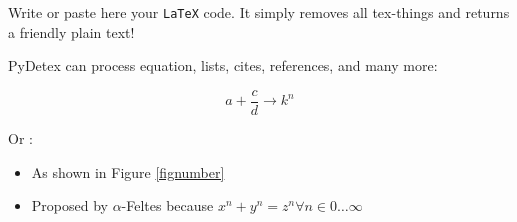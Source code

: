 Write or paste here your \texttt{LaTeX} code. It simply removes all tex-things and returns a friendly plain text! %

PyDetex can process equation, lists, cites, references, and many more:

\begin{equation}
    a + \frac{c}{d} \longrightarrow k^n
\end{equation}

Or :

\begin{itemize}[font=\bfseries]
    \item As shown in Figure \ref{fignumber}
    \item Proposed by $\alpha$-Feltes \cite{feltes2008} because $x^n + y^n = z^n \forall n \in 0 \ldots \infty$
\end{itemize}
